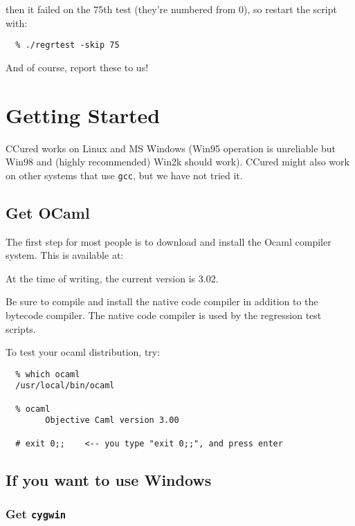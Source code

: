 \documentclass{book}
\def\t#1{{\tt #1}}
\begin{document}
then it failed on the 75th test (they're numbered from 0), so restart
the script with:

\begin{verbatim}
  % ./regrtest -skip 75
\end{verbatim}

And of course, report these to us!

        \chapter{Getting Started}\label{ch-start}

 CCured works on Linux and MS Windows (Win95 operation is unreliable but Win98
and (highly recommended) Win2k should work). CCured might also work on other
systems that use \t{gcc}, but we have not tried it.

\section{Get OCaml}

The first step for most people is to download and install the Ocaml
compiler system.  This is available at:


At the time of writing, the current version is 3.02.

Be sure to compile and install the native code compiler in addition
to the bytecode compiler.  The native code compiler is used by the
regression test scripts.

To test your ocaml distribution, try:

\begin{verbatim}
  % which ocaml
  /usr/local/bin/ocaml

  % ocaml
        Objective Caml version 3.00

  # exit 0;;    <-- you type "exit 0;;", and press enter
\end{verbatim}

\section{If you want to use Windows}

 \subsection{Get \t{cygwin}}
\end{document}
